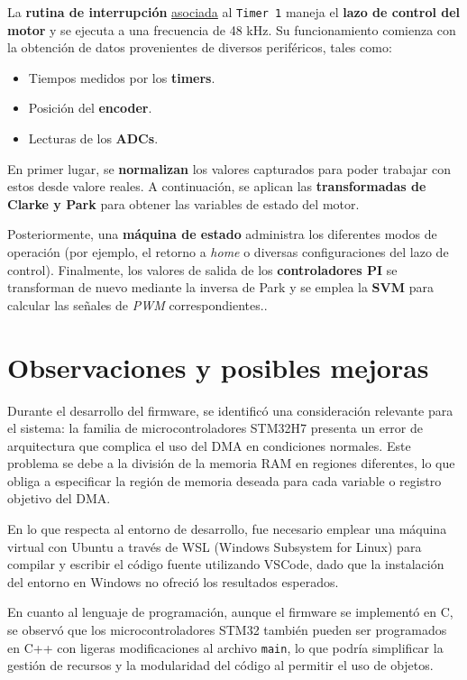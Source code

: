 \documentclass[11pt]{report}
\begin{document}
La \textbf{rutina de interrupción} \href{https://www.youtube.com/watch?v=RJX_jYm8T84}{asociada} al \texttt{Timer 1} maneja el \textbf{lazo de control del motor} y se ejecuta a una frecuencia de 48 kHz. Su funcionamiento comienza con la obtención de datos provenientes de diversos periféricos, tales como:
\begin{itemize}
    \item Tiempos medidos por los \textbf{timers}.
    \item Posición del \textbf{encoder}.
    \item Lecturas de los \textbf{ADCs}.
\end{itemize}
En primer lugar, se \textbf{normalizan} los valores capturados para poder trabajar con estos desde valore reales. A continuación, se aplican las \textbf{transformadas de Clarke y Park} para obtener las variables de estado del motor. 

Posteriormente, una \textbf{máquina de estado} administra los diferentes modos de operación (por ejemplo, el retorno a \emph{home} o diversas configuraciones del lazo de control). Finalmente, los valores de salida de los \textbf{controladores PI} se transforman de nuevo mediante la inversa de Park y se emplea la \textbf{SVM} para calcular las señales de \emph{PWM} correspondientes..

\newpage
\section{Observaciones y posibles mejoras}

Durante el desarrollo del firmware, se identificó una consideración relevante para el sistema: la familia de microcontroladores STM32H7 presenta un error de arquitectura que complica el uso del DMA en condiciones normales. Este problema se debe a la división de la memoria RAM en regiones diferentes, lo que obliga a especificar la región de memoria deseada para cada variable o registro objetivo del DMA.

En lo que respecta al entorno de desarrollo, fue necesario emplear una máquina virtual con Ubuntu a través de WSL (Windows Subsystem for Linux) para compilar y escribir el código fuente utilizando VSCode, dado que la instalación del entorno en Windows no ofreció los resultados esperados.

En cuanto al lenguaje de programación, aunque el firmware se implementó en C, se observó que los microcontroladores STM32 también pueden ser programados en C++ con ligeras modificaciones al archivo \texttt{main}, lo que podría simplificar la gestión de recursos y la modularidad del código al permitir el uso de objetos.
\end{document}

